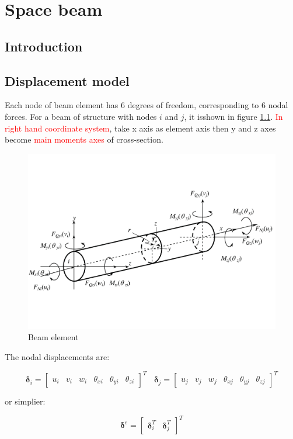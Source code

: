 
\chapter{Space beam}
\section{Introduction}

\section{Displacement model}
Each node of beam element has 6 degrees of freedom, corresponding to 6 nodal forces. For a beam of structure with nodes $ i $ and $ j $, it isshown in figure \ref{fig: space beam element}. \textcolor{red}{In right hand coordinate system}, take x axis as element axis then y and z axes become \textcolor{red}{main moments axes} of cross-section.

\begin{figure}[h!]
\centering
\includegraphics[width=0.5\linewidth]{figure/space_beam_element}
\caption{Beam element}
\label{fig: space beam element}
\end{figure}

The nodal displacements are:

\begin{equation}\label{eq: nodal displacements of beam}
\mathbf{\delta}_i = \begin{bmatrix}
u_i & v_i & w_i & \theta_{xi} & \theta_{yi} & \theta_{zi}
\end{bmatrix} ^T ~~~~ \mathbf{\delta}_j = \begin{bmatrix} u_j & v_j & w_j & \theta_{xj} & \theta_{yj} & \theta_{zj}
\end{bmatrix} ^T
\end{equation}

or simplier:

\begin{equation}\label{key}
\mathbf{\delta}^e = \begin{bmatrix} \mathbf{\delta}_i^T & \mathbf{\delta}_j^T \end{bmatrix}^T
\end{equation}

